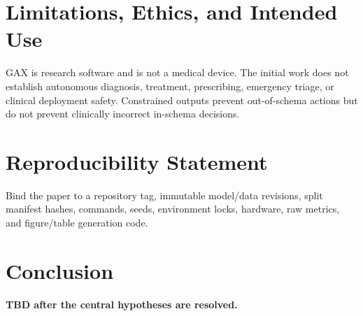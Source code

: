 \documentclass[11pt]{article}
\begin{document}
\section{Limitations, Ethics, and Intended Use}

GAX is research software and is not a medical device. The initial work does not
establish autonomous diagnosis, treatment, prescribing, emergency triage, or
clinical deployment safety. Constrained outputs prevent out-of-schema actions
but do not prevent clinically incorrect in-schema decisions.

\section{Reproducibility Statement}

Bind the paper to a repository tag, immutable model/data revisions, split
manifest hashes, commands, seeds, environment locks, hardware, raw metrics, and
figure/table generation code.

\section{Conclusion}

\textbf{TBD after the central hypotheses are resolved.}



\end{document}

